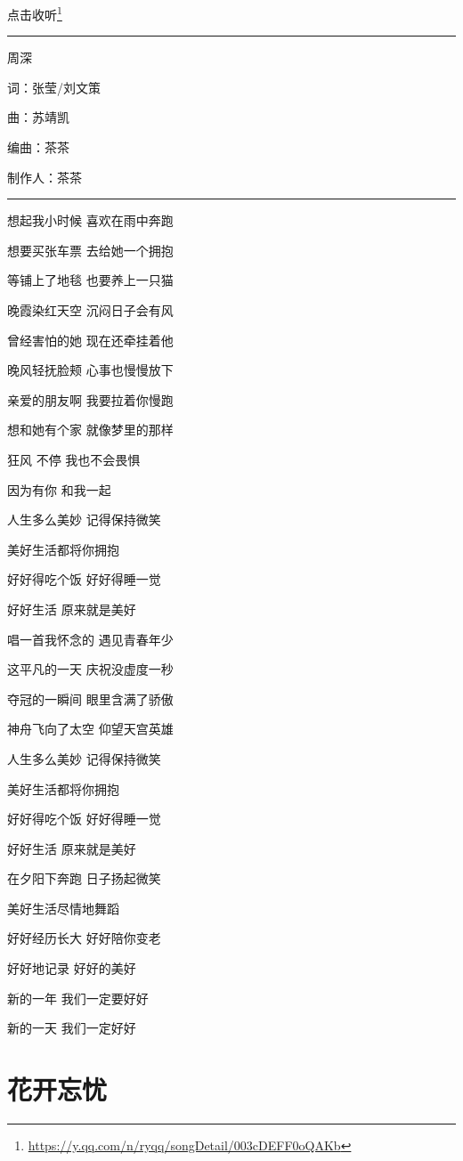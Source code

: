 \documentclass[]{ctexbook}
\renewcommand{\href}[2]{#2\footnote{\url{#1}}}
\begin{document}
\href{https://y.qq.com/n/ryqq/songDetail/003cDEFF0oQAKb}{点击收听}

\begin{center}\rule{0.5\linewidth}{0.5pt}\end{center}

周深

词：张莹/刘文策

曲：苏靖凯

编曲：茶茶

制作人：茶茶

\begin{center}\rule{0.5\linewidth}{0.5pt}\end{center}

想起我小时候 喜欢在雨中奔跑

想要买张车票 去给她一个拥抱

等铺上了地毯 也要养上一只猫

晚霞染红天空 沉闷日子会有风

曾经害怕的她 现在还牵挂着他

晚风轻抚脸颊 心事也慢慢放下

亲爱的朋友啊 我要拉着你慢跑

想和她有个家 就像梦里的那样

狂风 不停 我也不会畏惧

因为有你 和我一起

人生多么美妙 记得保持微笑

美好生活都将你拥抱

好好得吃个饭 好好得睡一觉

好好生活 原来就是美好

唱一首我怀念的 遇见青春年少

这平凡的一天 庆祝没虚度一秒

夺冠的一瞬间 眼里含满了骄傲

神舟飞向了太空 仰望天宫英雄

人生多么美妙 记得保持微笑

美好生活都将你拥抱

好好得吃个饭 好好得睡一觉

好好生活 原来就是美好

在夕阳下奔跑 日子扬起微笑

美好生活尽情地舞蹈

好好经历长大 好好陪你变老

好好地记录 好好的美好

新的一年 我们一定要好好

新的一天 我们一定好好

\section*{花开忘忧}\label{no-worries}
\end{document}
